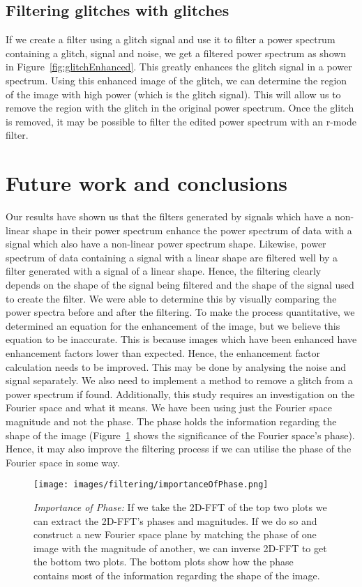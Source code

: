 \documentclass[%
reprint,
amsmath,amssymb,
aps,
]{revtex4-1}
\begin{document}
	\subsection{Filtering glitches with glitches}
	If we create a filter using a glitch signal and use it to filter a power spectrum containing a glitch, signal and noise, we get a filtered power spectrum as shown in Figure~\ref{fig:glitchEnhanced}. This greatly enhances the glitch signal in a power spectrum. Using this enhanced image of the glitch, we can determine the region of the image with high power (which is the glitch signal). This will allow us to remove the region with the glitch in the original power spectrum. Once the glitch is removed, it may be possible to filter the edited power spectrum with an r-mode filter. 
	
	
	\section{Future work and conclusions}
	Our results have shown us that the filters generated by signals which have a non-linear shape in their power spectrum enhance the power spectrum of data with a signal which also have a non-linear power spectrum shape. Likewise, power spectrum of data containing a signal with a linear shape are filtered well by a filter generated with a signal of a linear shape. Hence, the filtering clearly depends on the shape of the signal being filtered and the shape of the signal used to create the filter. We were able to determine this by visually comparing the power spectra before and after the filtering. To make the process quantitative, we determined an equation for the enhancement of the image, but we believe this equation to be inaccurate. This is because images which have been enhanced have enhancement factors lower than expected. Hence, the enhancement factor calculation needs to be improved. This may be done by analysing the noise and signal separately. We also need to implement a method to remove a glitch from a power spectrum if found.
	Additionally, this study requires an investigation on the Fourier space and what it means. We have been using just the Fourier space magnitude and not the phase. The phase holds the information regarding the shape of the image (Figure~\ref{fig:phaseImp} shows the significance of the Fourier space's phase). Hence, it may also improve the filtering process if we can utilise the phase of the Fourier space in some way.  
	
		\begin{figure}[H!]
			\centering
			\texttt{[image: images/filtering/importanceOfPhase.png]}
			\caption{\textit{Importance of Phase:} If we take the 2D-FFT of the top two plots we can extract the 2D-FFT's phases and magnitudes. If we do so and construct a new Fourier space plane by matching the phase of one image with the magnitude of another, we can inverse 2D-FFT to get the bottom two plots. The bottom plots show how the phase contains most of the information regarding the shape of the image.}
			\label{fig:phaseImp}
		\end{figure}
	
\end{document}
